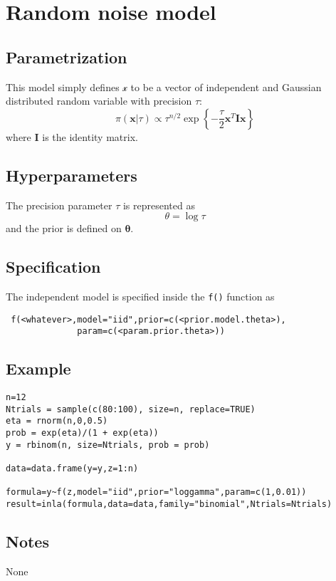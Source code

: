 \documentclass[a4paper,11pt]{article}
\begin{document}
\section*{Random noise model}

\subsection*{Parametrization}

This model simply defines $\mathcal{x}$ to be a vector of independent and Gaussian distributed random variable with precision $\tau$:
\[
\pi(\mathbf{x}|\tau) \propto \tau^{n/2}\exp\left\{  -\frac{\tau}{2}\mathbf{x}^T\mathbf{I}\mathbf{x} \right\}
\]
where $\mathbf{I}$  is the identity matrix.
\subsection*{Hyperparameters}

The precision parameter $\tau$ is represented as
\begin{displaymath}
    \theta =\log \tau
\end{displaymath}
and the prior is defined on $\mathbf{\theta}$. 

\subsection*{Specification}

The independent model is specified inside the {\tt f()} function as
\begin{verbatim}
 f(<whatever>,model="iid",prior=c(<prior.model.theta>),
              param=c(<param.prior.theta>))
\end{verbatim}
\subsection*{Example}

\begin{verbatim}
n=12
Ntrials = sample(c(80:100), size=n, replace=TRUE)
eta = rnorm(n,0,0.5)
prob = exp(eta)/(1 + exp(eta))
y = rbinom(n, size=Ntrials, prob = prob)

data=data.frame(y=y,z=1:n)

formula=y~f(z,model="iid",prior="loggamma",param=c(1,0.01))
result=inla(formula,data=data,family="binomial",Ntrials=Ntrials)
\end{verbatim}


\subsection*{Notes}

None
\end{document}
